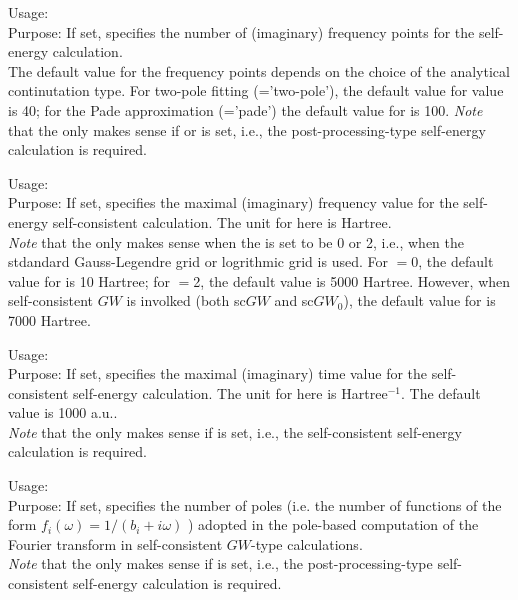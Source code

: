 { \noindent
  Usage:   \\[1.0ex]
  Purpose: If set, specifies the number of (imaginary) frequency points for the self-energy 
  calculation.\\[1.0ex]  
  The default value for the frequency points depends on the choice of the analytical continutation type.
  For two-pole fitting (='two-pole'), the default value for  value is 40;
  for the Pade approximation (='pade') the default value for  is 100.
}
\emph{Note} that the  only makes sense if 
 or  is set, i.e., the post-processing-type self-energy calculation 
is required.


{ \noindent
  Usage:   \\[1.0ex]
  Purpose: If set, specifies the maximal (imaginary) frequency value for the 
  self-energy self-consistent calculation.  The unit for  here is Hartree.\\[1.0ex]  
}
\emph{Note} that the  only makes sense when the  is set to be 0 or 2, i.e., when
the stdandard Gauss-Legendre grid or logrithmic grid is used. For $=$0, the default value for  is
10 Hartree; for $=$2, the default value is 5000 Hartree. However, when self-consistent $GW$ is involked (both sc$GW$ and sc$GW_0$), the
default value for  is 7000 Hartree.

{ \noindent
  Usage:   \\[1.0ex]
  Purpose: If set, specifies the maximal (imaginary) time value for the
  self-consistent self-energy calculation.  The unit for  here is Hartree$^{-1}$. The default value
  is 1000 a.u..\\[1.0ex]
}
\emph{Note} that the  only makes sense if
 is set, i.e., the self-consistent self-energy calculation
is required.

{ \noindent
  Usage:   \\[1.0ex]
  Purpose: If set, specifies the number of poles (i.e. the number of functions of the form 
  $f_i(\omega) = 1/(b_i +i\omega)$ ) adopted in the pole-based
  computation of the Fourier transform in self-consistent $GW$-type calculations. \\[1.0ex]
}
\emph{Note} that the  only makes sense if
 is set, i.e., the post-processing-type self-consistent self-energy calculation
is required.


